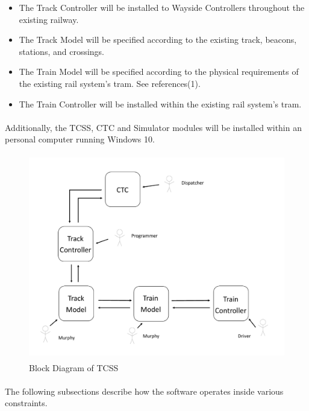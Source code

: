 \documentclass{article}
\begin{document}
    \begin{itemize}
        \item The Track Controller  will be installed to Wayside Controllers throughout the existing railway.
        \item The Track Model  will be specified according to the existing track, beacons, stations, and crossings.
        \item The Train Model will be specified according to the physical requirements of the existing rail system's tram. See references(1).
        \item The Train Controller  will be installed within the existing rail system's tram.
    \end{itemize}
    
    \paragraph{}
    Additionally, the TCSS, CTC  and Simulator modules will be installed within an personal computer running Windows 10. 
    
    \begin{figure} [!h]
    \centering
    \includegraphics[height=9cm,width=13cm]{SystemBlockDiagram.jpg}
    \caption{Block Diagram of TCSS}
    \end{figure}
    
    \paragraph{}
    The following subsections describe how the software operates inside various constraints.
\end{document}
